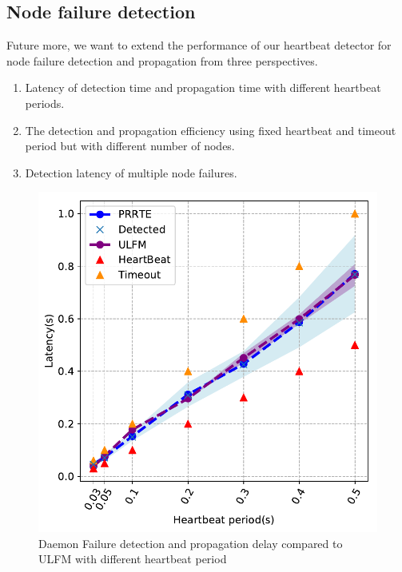 \documentclass[sigconf]{acmart}
\begin{document}
\subsection{Node failure detection}
Future more, we want to extend the performance of our heartbeat detector  for node failure detection and propagation from  three perspectives. 
\begin{enumerate}
  \item Latency of detection time and propagation time with different heartbeat periods.
  \item The detection and propagation efficiency using fixed heartbeat and timeout period but with different number of nodes.
  \item Detection latency of multiple node failures.
\end{enumerate}

\begin{figure}[h]
  \centering
  \includegraphics[width=\linewidth]{PRRTE_ULFM_new_nodebug.pdf}
  \caption{Daemon Failure detection and propagation delay compared to ULFM with different heartbeat period}
\end{figure}
\end{document}
